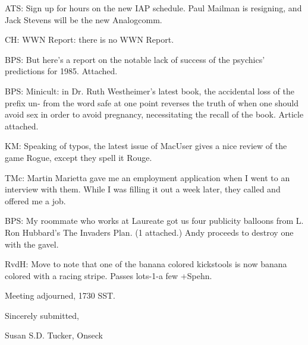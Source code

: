 \documentclass[12pt]{article}
\begin{document}
ATS: Sign up for hours on the new IAP schedule. Paul Mailman is resigning, and Jack Stevens will be the new Analogcomm.

CH: WWN Report: there is no WWN Report.

BPS: But here's a report on the notable lack of success of the psychics' predictions for 1985. Attached.

BPS: Minicult: in Dr. Ruth Westheimer's latest book, the accidental loss of the prefix un- from the word safe at one point reverses the truth of when one should avoid sex in order to avoid pregnancy, necessitating the recall of the book. Article attached.

KM: Speaking of typos, the latest issue of MacUser gives a nice review of the game Rogue, except they spell it Rouge.

TMc: Martin Marietta gave me an employment application when I went to an interview with them. While I was filling it out a week later, they called and offered me a job.

BPS: My roommate who works at Laureate got us four publicity balloons from L. Ron Hubbard's The Invaders Plan. (1 attached.) Andy proceeds to destroy one with the gavel.

RvdH: Move to note that one of the banana colored kickstools is now banana colored with a racing stripe. Passes lots-1-a few +Spehn.

\vspace{12pt}

\noindent
Meeting adjourned, 1730 SST.

\vspace{18pt}

\centerline{Sincerely submitted,}
\centerline{Susan S.D. Tucker, Onseck}
\end{document}
